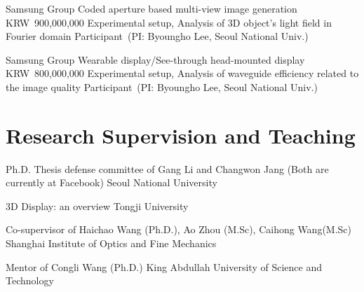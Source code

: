 \documentclass[10pt,a4paper]{moderncv}
\begin{document}

{Samsung Group}
{Coded aperture based multi-view image generation}
{KRW~900,000,000}
{Experimental setup, Analysis of 3D object's light field in Fourier domain}
{Participant~(PI: Byoungho Lee, Seoul National Univ.)}

{Samsung Group}
{Wearable display/See-through head-mounted display}
{KRW~800,000,000}
{Experimental setup, Analysis of waveguide efficiency related to the image quality}
{Participant~(PI: Byoungho Lee, Seoul National Univ.)}





\section{Research Supervision and Teaching}
{Ph.D. Thesis defense committee of Gang Li and Changwon Jang (Both are currently at Facebook)}
{Seoul National University}
{}
{}
{}

{3D Display: an overview}
{Tongji University}
{}{}{}

{Co-supervisor of Haichao Wang (Ph.D.), Ao Zhou (M.Sc), Caihong Wang(M.Sc)}
{Shanghai Institute of Optics and Fine Mechanics}
{}
{}
{}

{Mentor of Congli Wang (Ph.D.)}
{King Abdullah University of Science and Technology}
{}
{}
{}
\end{document}
